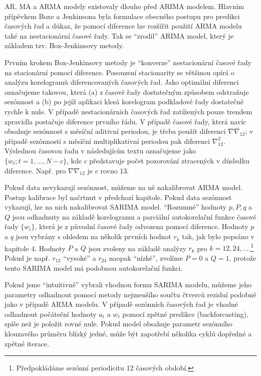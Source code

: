 AR, MA a ARMA modely existovaly dlouho před ARIMA modelem. Hlavním přípěvkem Boxe a Jenkinsona byla formulace obecného postupu pro predikci časových řad a důkaz, že pomocí diference lze rozšířit použití ARMA modelu také na nestacionární časové řady. Tak se ``zrodil'' ARIMA model, který je základem tzv. Box-Jenkinsovy metody.

Prvním krokem Box-Jenkinsovy metody je ``konverze'' nestacionární časové řady na stacionární pomocí diference. Posouzení stacionarity se většinou opírá o analýzu korelogramů diferencovaných časových řad. Jako optimální diferenci označujeme takovou, která (a) z časové řady dostatečným způsobem odstraňuje sezónnost a (b) po jejíž aplikaci klesá korelogram podkladové řady dostatečně rychle k nule. V případě nestacionárních časových řad zatížených pouze trendem zpravidla postačuje diference prvního řádu. V případě časové řady, která navíc obsahuje sezónnost s měsíční aditivní periodou, je třeba použít diferenci $\nabla \nabla_{12}$; v případě sezónnosti s měsíční multiplikativní periodou pak diferenci $\nabla_{12}^2$. Výslednou časovou řadu v následujícím textu označujeme jako $\{w_t; t = 1, ..., N - c\}$, kde $c$ představuje počet pozorování ztracených v důsledku diference. Např. pro $\nabla \nabla_{12}$ je $c$ rovno 13.

Pokud data nevykazují sezónnost, můžeme na ně nakalibrovat ARMA model. Postup kalibrace byl načrtnut v předchozí kapitole. Pokud data sezónnost vykazují, lze na nich nakalibrovat SARIMA model. ``Rozumné'' hodnoty $p, P, q$ a $Q$ jsou odhadnuty na základě korelogramu a parciální autokorelační funkce časové řady $\{w_i\}$, která je z původní časové řady odvozena pomocí diference. Hodnoty $p$ a $q$ jsou vybrány s ohledem na několik prvních hodnot $r_k$ tak, jak bylo popsáno v kapitole 4. Hodnoty $P$ a $Q$ jsou zvoleny na základě analýzy $r_k$ pro $k = 12, 24, ...$.\footnote{Předpokládáme sezónní periodicitu 12 časových období.} Pokud je např. $r_{12}$ ``vysoké'' a $r_{24}$ naopak ``nízké'', zvolíme $P = 0$ a $Q = 1$, protože tento SARIMA model má podobnou autokorelační funkci.

Pokud jsme ``intuitivně'' vybrali vhodnou formu SARIMA modelu, můžeme jeho parametry odhadnout pomocí metody nejmenšího součtu čtverců reziduí podobně jako v případě ARMA modelu. V případě sezónních časových řad je vhodné odhadnout počáteční hodnoty $a_t$ a $w_t$ pomocí zpětné predikce (backforcasting), spíše než je položit rovné nule. Pokud model obsahuje parametr sezónního klouzavého průměru blízký jedné, může být zapotřebí několika cyklů dopředné a zpětné iterace.

